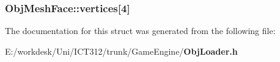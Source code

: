 \subsubsection[{vertices}]{ Obj\+Mesh\+Face\+::vertices[4]}\label{struct_obj_mesh_face_afc00aab78926911c3b31e09a0f2ebd23}


The documentation for this struct was generated from the following file\+:\begin{DoxyCompactItemize}
\item 
E\+:/workdesk/\+Uni/\+I\+C\+T312/trunk/\+Game\+Engine/{\bf Obj\+Loader.\+h}\end{DoxyCompactItemize}
